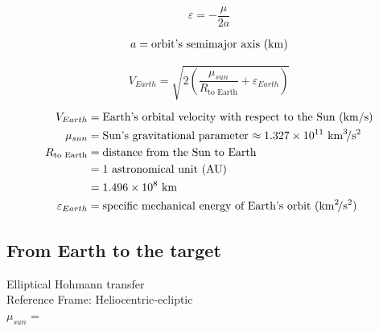 \documentclass{article}
\begin{document}
\begin{multicols}{3}
	\begin{equation*}
	\boxed{\varepsilon = - \dfrac{\mu}{2 a}}
	\end{equation*}

	\vfill\null
	\columnbreak

	\begin{align*}
	a = \text{orbit's semimajor axis (\si{\kilo\meter})}\\
	\end{align*}
\end{multicols}

\begin{equation*}
\boxed{V_{Earth} = \sqrt{2\left(\dfrac{\mu_{sun}}{R_{\text{to Earth}}} + \varepsilon_{Earth}\right)}}
\end{equation*}

\begin{align*}
V_{Earth} &= \text{Earth's orbital velocity with respect to the Sun (\si{\kilo\meter\per\second})}\\
\mu_{sun} &= \text{Sun's gravitational parameter $\approx 1.327 \times 10^{11}$ \si{\kilo\meter\cubed\per\second\squared}}\\
R_{\text{to Earth}} &= \text{distance from the Sun to Earth} \\
 &= \text{1 astronomical unit (AU)}\\
 &= \text{$1.496 \times 10^8$ \si{\kilo\meter}}\\
\varepsilon_{Earth} &= \text{specific mechanical energy of Earth's orbit (\si{\kilo\meter\squared\per\second\squared})}\\
\end{align*}

\subsection{From Earth to the target}
Elliptical Hohmann transfer\\
Reference Frame: Heliocentric-ecliptic\\
$\mu_{sun}$ = \\
\end{document}
